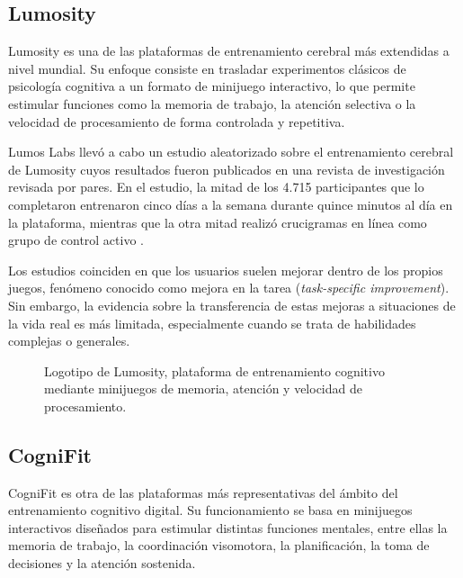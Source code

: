 \documentclass[12pt, a4paper]{report}
\begin{document}
\subsection{Lumosity}

Lumosity es una de las plataformas de entrenamiento cerebral más extendidas a
nivel mundial. Su enfoque consiste en trasladar experimentos clásicos de
psicología cognitiva a un formato de minijuego interactivo, lo que permite
estimular funciones como la memoria de trabajo, la atención selectiva o la
velocidad de procesamiento de forma controlada y repetitiva.

Lumos Labs llevó a cabo un estudio aleatorizado sobre el entrenamiento cerebral
de Lumosity cuyos resultados fueron publicados en una revista de investigación
revisada por pares. En el estudio, la mitad de los 4.715 participantes que lo
completaron entrenaron cinco días a la semana durante quince minutos al día en
la plataforma, mientras que la otra mitad realizó crucigramas en línea como
grupo de control activo \citep{LumosityWeb}.

Los estudios coinciden en que los usuarios suelen mejorar dentro de los propios
juegos, fenómeno conocido como mejora en la tarea (\textit{task-specific
improvement}). Sin embargo, la evidencia sobre la transferencia de estas mejoras
a situaciones de la vida real es más limitada, especialmente cuando se trata de
habilidades complejas o generales.

\begin{figure}[H]
  \centering
  \framebox[6cm]{\parbox[c][3cm]{5.5cm}{\centering\small\textcolor{gray}{[Captura: Lumosity]}}}
  \caption{Logotipo de Lumosity, plataforma de entrenamiento cognitivo
    mediante minijuegos de memoria, atención y velocidad de procesamiento.}
  \label{fig:lumosity}
\end{figure}

\subsection{CogniFit}

CogniFit es otra de las plataformas más representativas del ámbito del
entrenamiento cognitivo digital. Su funcionamiento se basa en minijuegos
interactivos diseñados para estimular distintas funciones mentales, entre
ellas la memoria de trabajo, la coordinación visomotora, la planificación, la
toma de decisiones y la atención sostenida.
\end{document}
